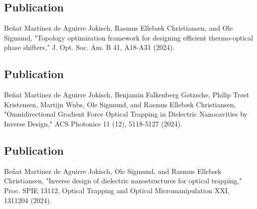 \vspace*{0.4\textheight}
\begin{center}
  \begin{minipage}{0.9\linewidth}
    \section*{Publication \cite{ownpub0}}
    Beñat Martinez de Aguirre Jokisch, Rasmus Ellebæk Christiansen, and Ole Sigmund, "Topology optimization framework for designing efficient thermo-optical phase shifters," J. Opt. Soc. Am. B 41, A18-A31 (2024).
  \end{minipage}
\end{center}
\newpage


\vspace*{0.4\textheight}
\begin{center}
  \begin{minipage}{0.9\linewidth}
    \section*{Publication \cite{ownpub1}}
    Beñat Martinez de Aguirre Jokisch, Benjamin Falkenberg Gøtzsche, Philip Trøst Kristensen, Martijn Wubs, Ole Sigmund, and Rasmus Ellebæk Christiansen, "Omnidirectional Gradient Force Optical Trapping in Dielectric Nanocavities by Inverse Design," ACS Photonics 11 (12), 5118-5127 (2024).
  \end{minipage}
\end{center}
\newpage


\vspace*{0.4\textheight}
\begin{center}
  \begin{minipage}{0.9\linewidth}
    \section*{Publication \cite{ownpub3}}
    Beñat Martinez de Aguirre Jokisch, Ole Sigmund, and Rasmus Ellebæk Christiansen, "Inverse design of dielectric nanostructures for optical trapping,"  Proc. SPIE 13112, Optical Trapping and Optical Micromanipulation XXI, 1311204 (2024).
  \end{minipage}
\end{center}
\newpage


